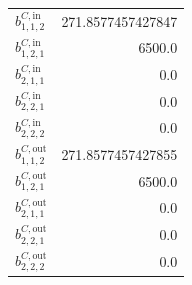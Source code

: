 \documentclass{article}%
\begin{document}
\begin{multicols*}{3}
\begin{supertabular}{lr}
	$b_{1,1,2}^{C,\text{in}}$ & 271.8577457427847 \\%
	$b_{1,2,1}^{C,\text{in}}$ & 6500.0 \\%
	$b_{2,1,1}^{C,\text{in}}$ & 0.0 \\%
	$b_{2,2,1}^{C,\text{in}}$ & 0.0 \\%
	$b_{2,2,2}^{C,\text{in}}$ & 0.0 \\%
	$b_{1,1,2}^{C,\text{out}}$ & 271.8577457427855 \\%
	$b_{1,2,1}^{C,\text{out}}$ & 6500.0 \\%
	$b_{2,1,1}^{C,\text{out}}$ & 0.0 \\%
	$b_{2,2,1}^{C,\text{out}}$ & 0.0 \\%
	$b_{2,2,2}^{C,\text{out}}$ & 0.0 \\%
\end{supertabular}%
\end{multicols*}%
\end{document}
